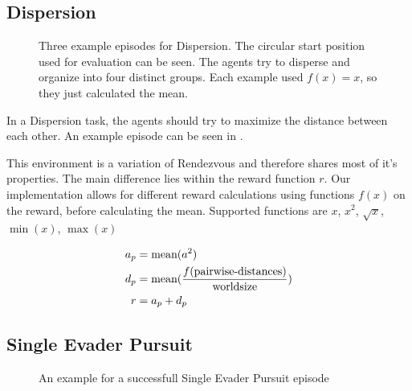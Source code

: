 \subsection{Dispersion}
\begin{figure}[htp]
    \centering
    \hspace{1cm}                       
    \caption{Three example episodes for Dispersion. The circular start position used for evaluation can be seen. The agents try to disperse and organize into four distinct groups. Each example used $f(x) = x$, so they just calculated the mean.}
    \label{fig:dispersion_example}
\end{figure}

In a Dispersion task, the agents should try to maximize the distance between each other. An example episode can be seen in .\par

This environment is a variation of Rendezvous and therefore shares most of it's properties. The main difference lies within the reward function $r$. Our implementation allows for different reward calculations using functions $f(x)$ on the reward, before calculating the mean. Supported functions are $x$, $x^2$, $\sqrt{x}$, $\min(x)$, $\max(x)$

\begin{equation}
    \begin{aligned}
        a_p &= \textup{mean}(a^2)\\
        d_p &= \textup{mean}(\frac{f(\textup{pairwise-distances})}{\textup{worldsize}}) \\
        r &= a_p + d_p
    \end{aligned}
    \nonumber
\end{equation}



\subsection{Single Evader Pursuit}
\label{sec:Single Evader Pursuit}
\begin{figure}[htp]
    \centering
    \hspace{1cm}                       
    \caption{An example for a successfull Single Evader Pursuit episode}
    \label{fig:single_evader_example}
\end{figure}

